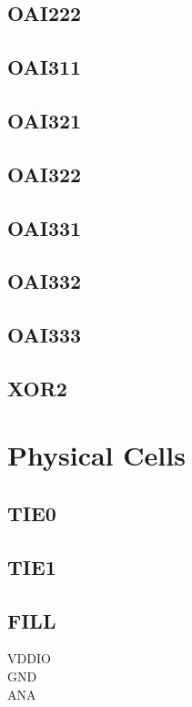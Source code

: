 \documentclass[10pt,a4paper,twoside]{report}
\begin{document}
\section{OAI222}

\clearpage

\section{OAI311}

\clearpage

\section{OAI321}

\clearpage

\section{OAI322}

\clearpage

\section{OAI331}

\clearpage

\section{OAI332}

\clearpage

\section{OAI333}

\clearpage


\section{XOR2}

\clearpage

\onecolumn

\chapter{Physical Cells}
\clearpage

\twocolumn

\section{TIE0}

\clearpage

\section{TIE1}

\clearpage

\section{FILL}

\clearpage

VDDIO \\
GND \\
ANA

\onecolumn
\
\end{document}
